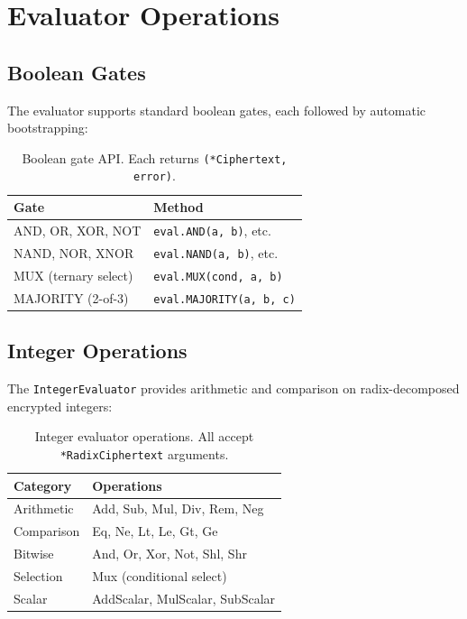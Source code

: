 \section{Evaluator Operations}


\subsection{Boolean Gates}

The evaluator supports standard boolean gates, each followed by automatic bootstrapping:

\begin{table}[h]
\centering
\begin{tabular}{@{}ll@{}}
\toprule
\textbf{Gate} & \textbf{Method} \\
\midrule
AND, OR, XOR, NOT & \texttt{eval.AND(a, b)}, etc. \\
NAND, NOR, XNOR & \texttt{eval.NAND(a, b)}, etc. \\
MUX (ternary select) & \texttt{eval.MUX(cond, a, b)} \\
MAJORITY (2-of-3) & \texttt{eval.MAJORITY(a, b, c)} \\
\bottomrule
\end{tabular}
\caption{Boolean gate API. Each returns \texttt{(*Ciphertext, error)}.}
\label{tab:gates}
\end{table}

\subsection{Integer Operations}

The \texttt{IntegerEvaluator} provides arithmetic and comparison on radix-decomposed encrypted integers:

\begin{table}[h]
\centering
\begin{tabular}{@{}ll@{}}
\toprule
\textbf{Category} & \textbf{Operations} \\
\midrule
Arithmetic & Add, Sub, Mul, Div, Rem, Neg \\
Comparison & Eq, Ne, Lt, Le, Gt, Ge \\
Bitwise & And, Or, Xor, Not, Shl, Shr \\
Selection & Mux (conditional select) \\
Scalar & AddScalar, MulScalar, SubScalar \\
\bottomrule
\end{tabular}
\caption{Integer evaluator operations. All accept \texttt{*RadixCiphertext} arguments.}
\label{tab:int-ops}
\end{table}

